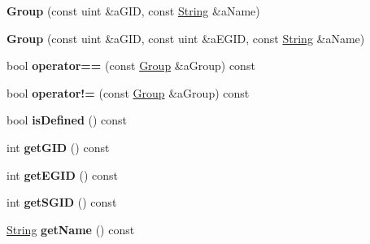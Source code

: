\begin{DoxyCompactItemize}
\item 
\mbox{\label{classlibrary_1_1core_1_1system_1_1_group_ad9b37c98ac79505f5fbcee71b8cf2b36}} 
{\bfseries Group} (const uint \&a\+G\+ID, const \hyperlink{classlibrary_1_1core_1_1types_1_1_string}{String} \&a\+Name)
\item 
\mbox{\label{classlibrary_1_1core_1_1system_1_1_group_aa6a21b13948d6be0e344503b9e31f3ef}} 
{\bfseries Group} (const uint \&a\+G\+ID, const uint \&a\+E\+G\+ID, const \hyperlink{classlibrary_1_1core_1_1types_1_1_string}{String} \&a\+Name)
\item 
\mbox{\label{classlibrary_1_1core_1_1system_1_1_group_a51f4fbabf077878249d72db242a1debb}} 
bool {\bfseries operator==} (const \hyperlink{classlibrary_1_1core_1_1system_1_1_group}{Group} \&a\+Group) const
\item 
\mbox{\label{classlibrary_1_1core_1_1system_1_1_group_a156a737e03a483bca163ec9da3cccb8b}} 
bool {\bfseries operator!=} (const \hyperlink{classlibrary_1_1core_1_1system_1_1_group}{Group} \&a\+Group) const
\item 
\mbox{\label{classlibrary_1_1core_1_1system_1_1_group_a5b09eed8a6cdc2f29caf7eee6ad57ef0}} 
bool {\bfseries is\+Defined} () const
\item 
\mbox{\label{classlibrary_1_1core_1_1system_1_1_group_a22d1dd28ab638e043d1ca1aac19af36e}} 
int {\bfseries get\+G\+ID} () const
\item 
\mbox{\label{classlibrary_1_1core_1_1system_1_1_group_ab9677f28eb1f6653ad9c5776d1f00c3f}} 
int {\bfseries get\+E\+G\+ID} () const
\item 
\mbox{\label{classlibrary_1_1core_1_1system_1_1_group_a45d3ee1f569a68ab4bec033cb802f6b3}} 
int {\bfseries get\+S\+G\+ID} () const
\item 
\mbox{\label{classlibrary_1_1core_1_1system_1_1_group_a28d73668971941ff02c106f07b599712}} 
\hyperlink{classlibrary_1_1core_1_1types_1_1_string}{String} {\bfseries get\+Name} () const
\end{DoxyCompactItemize}
